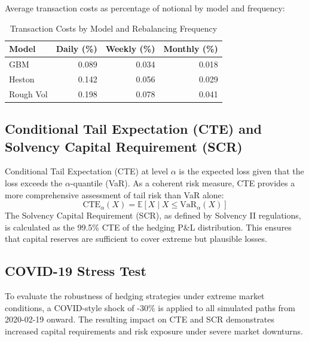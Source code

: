 \documentclass[12pt,a4paper]{report}
\begin{document}
Average transaction costs as percentage of notional by model and frequency:

\begin{table}[H]
\centering
\caption{Transaction Costs by Model and Rebalancing Frequency}
\label{tab:transaction_costs}
\begin{tabular}{lrrr}
\toprule
Model & Daily (\%) & Weekly (\%) & Monthly (\%) \\
\midrule
GBM & 0.089 & 0.034 & 0.018 \\
Heston & 0.142 & 0.056 & 0.029 \\
Rough Vol & 0.198 & 0.078 & 0.041 \\
\bottomrule
\end{tabular}
\end{table}

\subsection{Conditional Tail Expectation (CTE) and Solvency Capital Requirement (SCR)}
Conditional Tail Expectation (CTE) at level $\alpha$ is the expected loss given that the loss exceeds the $\alpha$-quantile (VaR). As a coherent risk measure, CTE provides a more comprehensive assessment of tail risk than VaR alone:
\[
\mathrm{CTE}_\alpha(X) = \mathbb{E}[X \mid X \leq \mathrm{VaR}_\alpha(X)]
\]
The Solvency Capital Requirement (SCR), as defined by Solvency II regulations, is calculated as the 99.5\% CTE of the hedging P\&L distribution. This ensures that capital reserves are sufficient to cover extreme but plausible losses.

\subsection{COVID-19 Stress Test}
To evaluate the robustness of hedging strategies under extreme market conditions, a COVID-style shock of -30\% is applied to all simulated paths from 2020-02-19 onward. The resulting impact on CTE and SCR demonstrates increased capital requirements and risk exposure under severe market downturns.

\end{document}
